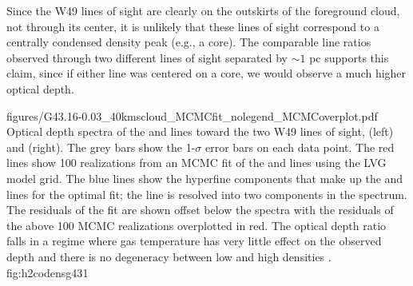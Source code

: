 Since the W49 lines of sight are clearly on the outskirts of the foreground
cloud, not through its center, it is unlikely that these lines of sight
correspond to a centrally condensed density peak (e.g., a core).  The
comparable line ratios observed through two different lines of sight separated
by $\sim 1$ pc supports this claim, since if either line was centered on a
core, we would observe a much higher \twotwo optical depth.


          {figures/G43.16-0.03_40kmscloud_MCMCfit_nolegend_MCMCoverplot.pdf}
{Optical depth spectra of the \oneone and \twotwo lines toward the two W49
lines of sight, \north (left) and \south (right).   The grey bars show the
1-$\sigma$ error bars on each data point.  The red lines show 100 realizations
from an MCMC fit of the \ortho \oneone and \twotwo lines using the LVG model
grid.  The blue lines show the hyperfine components that make up the \oneone
and \twotwo lines for the optimal fit; the \oneone line is resolved into two
components in the \north spectrum.  The residuals of the fit are shown offset
below the spectra with the residuals of the above 100 MCMC realizations
overplotted in red.  The optical depth ratio falls in a regime where
gas temperature has very little effect on the observed depth and there is no
degeneracy between low and high densities \citep{Ginsburg2011a}.  }
{fig:h2codensg43}{1}

